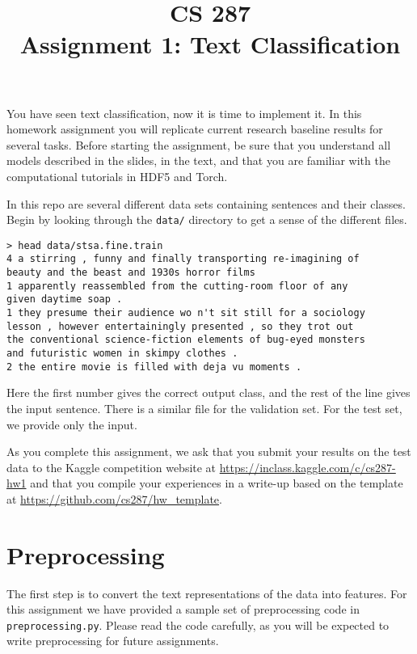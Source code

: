 \documentclass[11pt]{article}
\title{CS 287 \\ Assignment 1: Text Classification }
\date{}
\begin{document}
\maketitle{}

You have seen text classification, now it is time to implement it.  In
this homework assignment you will replicate current research baseline
results for several tasks. Before starting the assignment, be sure that
you understand all models described in the slides, in the text, and
that you are familiar with the computational tutorials in HDF5 and
Torch.


In this repo are several different data sets containing sentences and 
their classes. Begin by looking through the \texttt{data/} directory 
to get a sense of the different files.


\begin{verbatim}
> head data/stsa.fine.train
4 a stirring , funny and finally transporting re-imagining of 
beauty and the beast and 1930s horror films
1 apparently reassembled from the cutting-room floor of any 
given daytime soap .
1 they presume their audience wo n't sit still for a sociology 
lesson , however entertainingly presented , so they trot out 
the conventional science-fiction elements of bug-eyed monsters 
and futuristic women in skimpy clothes .
2 the entire movie is filled with deja vu moments .
\end{verbatim}

Here the first number gives the correct output class, and the rest of
the line gives the input sentence. There is a similar file for the
validation set. For the test set, we provide only the input.

As you complete this assignment, we ask that you submit your results
on the test data to the Kaggle competition website at
\url{https://inclass.kaggle.com/c/cs287-hw1} and that you compile your
experiences in a write-up based on the template at
\url{https://github.com/cs287/hw_template}.

\section{Preprocessing}

The first step is to convert the text representations of the data into
features. For this assignment we have provided a sample set of
preprocessing code in \texttt{preprocessing.py}. Please read the code
carefully, as you will be expected to write preprocessing for
future assignments.  
\end{document}
